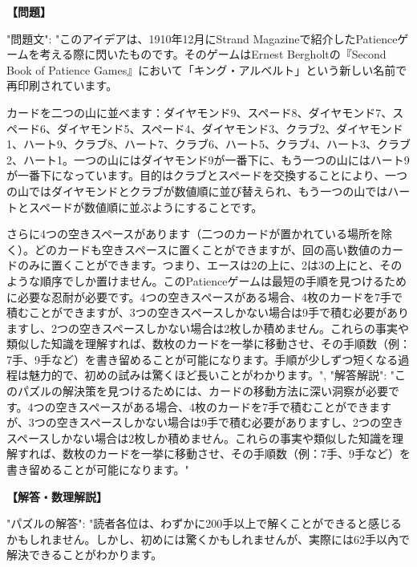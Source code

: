 \documentclass[10pt,a4paper,oneside,openany]{ltjsbook}
\begin{document}
\begin{tcolorbox}[colback=softblue,colframe=primaryblue,title=\textbf{第 385 問："STRAND" PATIENCE.},arc=2mm,boxrule=1pt,breakable]
\textbf{【問題】}\par\vspace{0.3em}
{
"問題文": "このアイデアは、1910年12月にStrand Magazineで紹介したPatienceゲームを考える際に閃いたものです。そのゲームはErnest Bergholtの『Second Book of Patience Games』において「キング・アルベルト」という新しい名前で再印刷されています。

カードを二つの山に並べます：ダイヤモンド9、スペード8、ダイヤモンド7、スペード6、ダイヤモンド5、スペード4、ダイヤモンド3、クラブ2、ダイヤモンド1、ハート9、クラブ8、ハート7、クラブ6、ハート5、クラブ4、ハート3、クラブ2、ハート1。一つの山にはダイヤモンド9が一番下に、もう一つの山にはハート9が一番下になっています。目的はクラブとスペードを交換することにより、一つの山ではダイヤモンドとクラブが数値順に並び替えられ、もう一つの山ではハートとスペードが数値順に並ぶようにすることです。

さらに4つの空きスペースがあります（二つのカードが置かれている場所を除く）。どのカードも空きスペースに置くことができますが、回の高い数値のカードのみに置くことができます。つまり、エースは2の上に、2は3の上にと、そのような順序でしか置けません。このPatienceゲームは最短の手順を見つけるために必要な忍耐が必要です。4つの空きスペースがある場合、4枚のカードを7手で積むことができますが、3つの空きスペースしかない場合は9手で積む必要がありますし、2つの空きスペースしかない場合は2枚しか積めません。これらの事実や類似した知識を理解すれば、数枚のカードを一挙に移動させ、その手順数（例：7手、9手など）を書き留めることが可能になります。手順が少しずつ短くなる過程は魅力的で、初めの試みは驚くほど長いことがわかります。",
"解答解説": "このパズルの解決策を見つけるためには、カードの移動方法に深い洞察が必要です。4つの空きスペースがある場合、4枚のカードを7手で積むことができますが、3つの空きスペースしかない場合は9手で積む必要がありますし、2つの空きスペースしかない場合は2枚しか積めません。これらの事実や類似した知識を理解すれば、数枚のカードを一挙に移動させ、その手順数（例：7手、9手など）を書き留めることが可能になります。"
}
\tcblower
\textbf{【解答・数理解説】}\par\vspace{0.3em}
{
"パズルの解答": "読者各位は、わずかに200手以上で解くことができると感じるかもしれません。しかし、初めには驚くかもしれませんが、実際には62手以內で解決できることがわかります。

}
\end{tcolorbox}
\end{document}
